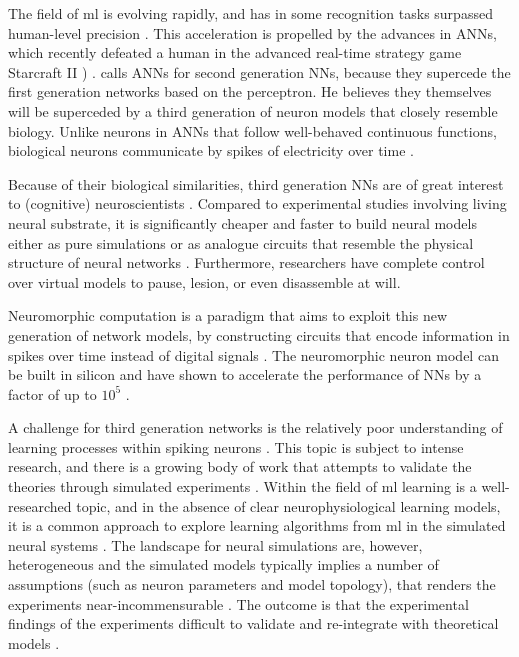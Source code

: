 

The field of \gls{ml} is evolving rapidly, and has in
some recognition tasks surpassed human-level precision
\autocite{Schmidhuber2014}.
This acceleration is propelled by the advances in \glspl{ANN}, 
which recently defeated a human in the
advanced real-time strategy game Starcraft II \cite{DeepMind2019})
\autocite{Schmidhuber2014, Nilsson2009, Russel2007}.
\citeauthor{Maass1997} calls \glspl{ANN} for second generation
\glspl{NN}, because they supercede the first generation networks
based on the perceptron.
He believes they themselves will be superceded by a third generation of neuron
models that closely resemble biology.
Unlike neurons in \glspl{ANN} that follow well-behaved continuous
functions, biological neurons communicate by spikes of
electricity over time
\cite{Maass1997}.

Because of their biological similarities, third generation 
\glspl{NN} are of great interest to (cognitive) neuroscientists
\autocite{Dayan2001,Bruderle2011,Eliasmith2015}.
Compared to experimental studies involving living neural substrate,
it is significantly cheaper and faster to build neural 
models either as pure simulations
\autocite{Davison2009, Eliasmith2015} or as analogue circuits
that resemble the physical structure of neural networks
\autocite{Walter2015, Schmitt2017}.
Furthermore, researchers have complete control over virtual models
to pause, lesion, or even disassemble at will.

Neuromorphic computation is a paradigm that aims to exploit this new
generation of network models, by constructing circuits that encode information
in spikes over time instead of digital signals \cite{Eliasmith2015, Albada2018}.
The neuromorphic neuron model can be built in
silicon and have shown to accelerate the performance of \glspl{NN}
by a factor of up to $10^5$ \cite{Albada2018, Schmitt2017}.

A challenge for third generation networks is the relatively
poor understanding of learning processes within spiking neurons \autocite{Tavanei2015,
Walter2015}.
This topic is subject to intense research, and there is a growing body of work
that attempts to validate the theories through simulated experiments 
\cite{Indiveri2015, Tavanaei2019}.
Within the field of \gls{ml} learning is a well-researched topic, and in the
absence of clear neurophysiological learning models, it is a common approach to 
explore learning algorithms from \gls{ml} in the simulated neural systems
\cite{Lee2016,Schmitt2017,Walter2015,Diehl2015,Rueckauer2017}.
The landscape for neural simulations are, however, heterogeneous and the
simulated models typically implies a number of assumptions (such as neuron
parameters and model topology), that renders the experiments near-incommensurable
\cite{Albada2018, Lee2016, Rueckauer2017}.
The outcome is that the experimental findings of the experiments difficult to validate
and re-integrate with theoretical models \autocite{Rueckauer2017, Albada2018,
Bruderle2011}.

